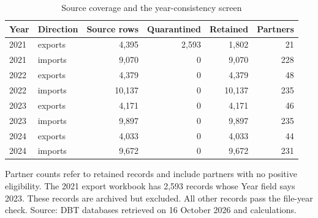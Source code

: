 \begin{table}[!htbp]
\centering
\caption{Source coverage and the year-consistency screen}\label{tab:coverage}
\small
\begin{tabular}{llrrrr}
\toprule
Year & Direction & Source rows & Quarantined & Retained & Partners \\
\midrule
2021 & exports & 4,395 & 2,593 & 1,802 & 21 \\
2021 & imports & 9,070 & 0 & 9,070 & 228 \\
2022 & exports & 4,379 & 0 & 4,379 & 48 \\
2022 & imports & 10,137 & 0 & 10,137 & 235 \\
2023 & exports & 4,171 & 0 & 4,171 & 46 \\
2023 & imports & 9,897 & 0 & 9,897 & 235 \\
2024 & exports & 4,033 & 0 & 4,033 & 44 \\
2024 & imports & 9,672 & 0 & 9,672 & 231 \\
\bottomrule
\end{tabular}
\par\vspace{3pt}\begin{minipage}{.97\linewidth}\footnotesize Partner counts refer to retained records and include partners with no positive eligibility. The 2021 export workbook has 2,593 records whose Year field says 2023. These records are archived but excluded. All other records pass the file-year check. Source: DBT databases retrieved on 16 October 2026 and calculations.\end{minipage}
\end{table}
